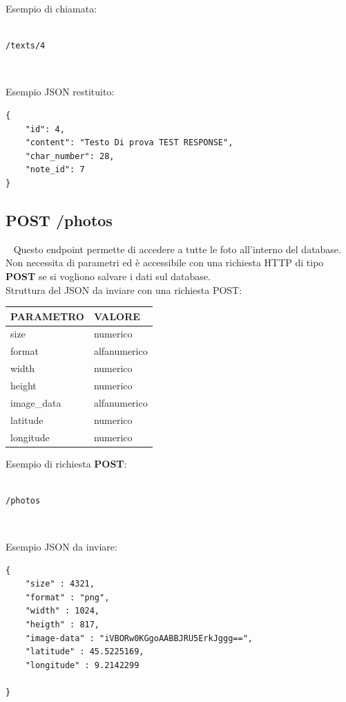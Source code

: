 Esempio di chiamata:
\begin{lstlisting}

/texts/4

\end{lstlisting}

\ \linebreak

Esempio JSON restituito:
\begin{lstlisting}
{
	"id": 4,
	"content": "Testo Di prova TEST RESPONSE",
	"char_number": 28,
	"note_id": 7
}
\end{lstlisting}

\subsection{POST /photos}
\ \linebreak
Questo endpoint permette di accedere a tutte le foto all'interno del database. Non necessita di parametri ed è accessibile con una richiesta HTTP di tipo \textbf{POST} se si vogliono salvare i dati sul database.\\

Struttura del JSON da inviare con una richiesta POST:

\begin{table}[!h]
	\centering
	\begin{tabular}{@{}ll@{}}
		\toprule
		\textbf{PARAMETRO} & \textbf{VALORE}  \\ \midrule
		size               & numerico\\ 
		format             & alfanumerico\\
		width              & numerico\\
		height             & numerico\\
		image\_data        & alfanumerico\\
		latitude           & numerico\\ 
		longitude          & numerico\\ \bottomrule		
	\end{tabular}
\end{table}

Esempio di richiesta \textbf{POST}:
\begin{lstlisting}

/photos	

\end{lstlisting}

\ \linebreak

Esempio JSON da inviare:
\begin{lstlisting}
{
	"size" : 4321,
	"format" : "png",
	"width" : 1024,
	"heigth" : 817,
	"image-data" : "iVBORw0KGgoAABBJRU5ErkJggg==",     
	"latitude" : 45.5225169,
	"longitude" : 9.2142299

}
\end{lstlisting}

